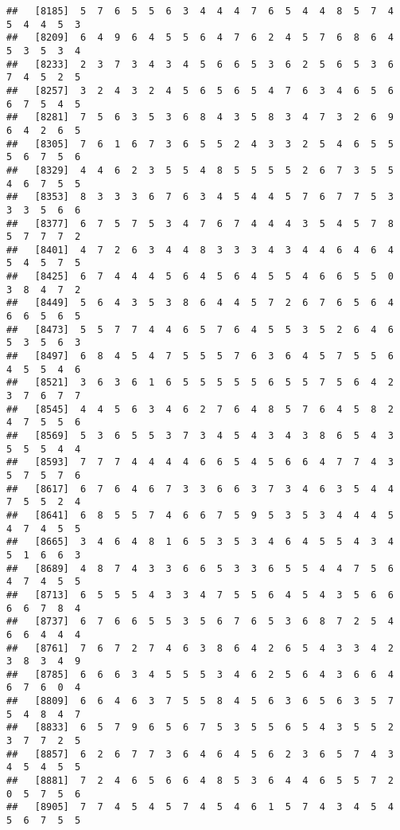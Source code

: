 \documentclass[
]{book}
\begin{document}
\begin{verbatim}
##   [8185]  5  7  6  5  5  6  3  4  4  4  7  6  5  4  4  8  5  7  4  5  4  4  5  3
##   [8209]  6  4  9  6  4  5  5  6  4  7  6  2  4  5  7  6  8  6  4  5  3  5  3  4
##   [8233]  2  3  7  3  4  3  4  5  6  6  5  3  6  2  5  6  5  3  6  7  4  5  2  5
##   [8257]  3  2  4  3  2  4  5  6  5  6  5  4  7  6  3  4  6  5  6  6  7  5  4  5
##   [8281]  7  5  6  3  5  3  6  8  4  3  5  8  3  4  7  3  2  6  9  6  4  2  6  5
##   [8305]  7  6  1  6  7  3  6  5  5  2  4  3  3  2  5  4  6  5  5  5  6  7  5  6
##   [8329]  4  4  6  2  3  5  5  4  8  5  5  5  5  2  6  7  3  5  5  4  6  7  5  5
##   [8353]  8  3  3  3  6  7  6  3  4  5  4  4  5  7  6  7  7  5  3  3  3  5  6  6
##   [8377]  6  7  5  7  5  3  4  7  6  7  4  4  4  3  5  4  5  7  8  5  7  7  7  2
##   [8401]  4  7  2  6  3  4  4  8  3  3  3  4  3  4  4  6  4  6  4  5  4  5  7  5
##   [8425]  6  7  4  4  4  5  6  4  5  6  4  5  5  4  6  6  5  5  0  3  8  4  7  2
##   [8449]  5  6  4  3  5  3  8  6  4  4  5  7  2  6  7  6  5  6  4  6  6  5  6  5
##   [8473]  5  5  7  7  4  4  6  5  7  6  4  5  5  3  5  2  6  4  6  5  3  5  6  3
##   [8497]  6  8  4  5  4  7  5  5  5  7  6  3  6  4  5  7  5  5  6  4  5  5  4  6
##   [8521]  3  6  3  6  1  6  5  5  5  5  5  6  5  5  7  5  6  4  2  3  7  6  7  7
##   [8545]  4  4  5  6  3  4  6  2  7  6  4  8  5  7  6  4  5  8  2  4  7  5  5  6
##   [8569]  5  3  6  5  5  3  7  3  4  5  4  3  4  3  8  6  5  4  3  5  5  5  4  4
##   [8593]  7  7  7  4  4  4  4  6  6  5  4  5  6  6  4  7  7  4  3  5  7  5  7  6
##   [8617]  6  7  6  4  6  7  3  3  6  6  3  7  3  4  6  3  5  4  4  7  5  5  2  4
##   [8641]  6  8  5  5  7  4  6  6  7  5  9  5  3  5  3  4  4  4  5  4  7  4  5  5
##   [8665]  3  4  6  4  8  1  6  5  3  5  3  4  6  4  5  5  4  3  4  5  1  6  6  3
##   [8689]  4  8  7  4  3  3  6  6  5  3  3  6  5  5  4  4  7  5  6  4  7  4  5  5
##   [8713]  6  5  5  5  4  3  3  4  7  5  5  6  4  5  4  3  5  6  6  6  6  7  8  4
##   [8737]  6  7  6  6  5  5  3  5  6  7  6  5  3  6  8  7  2  5  4  6  6  4  4  4
##   [8761]  7  6  7  2  7  4  6  3  8  6  4  2  6  5  4  3  3  4  2  3  8  3  4  9
##   [8785]  6  6  6  3  4  5  5  5  3  4  6  2  5  6  4  3  6  6  4  6  7  6  0  4
##   [8809]  6  6  4  6  3  7  5  5  8  4  5  6  3  6  5  6  3  5  7  5  4  8  4  7
##   [8833]  6  5  7  9  6  5  6  7  5  3  5  5  6  5  4  3  5  5  2  3  7  7  2  5
##   [8857]  6  2  6  7  7  3  6  4  6  4  5  6  2  3  6  5  7  4  3  4  5  4  5  5
##   [8881]  7  2  4  6  5  6  6  4  8  5  3  6  4  4  6  5  5  7  2  0  5  7  5  6
##   [8905]  7  7  4  5  4  5  7  4  5  4  6  1  5  7  4  3  4  5  4  5  6  7  5  5

\end{verbatim}
\end{document}
